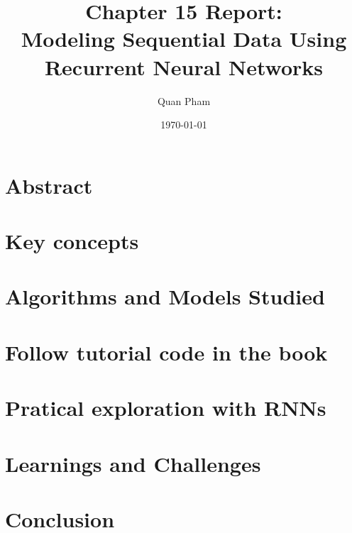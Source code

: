 \documentclass[12pt]{article}
\title{Chapter 15 Report: \\ Modeling Sequential Data Using Recurrent Neural Networks}
\author{Quan Pham}
\date{\today}
\begin{document}
\maketitle
\tableofcontents
\newpage

\section{Abstract}


\section{Key concepts}


\section{Algorithms and Models Studied}


\section{Follow tutorial code in the book}


\section{Pratical exploration with RNNs}


\section{Learnings and Challenges}


\section{Conclusion}


% 
% 
\end{document}
